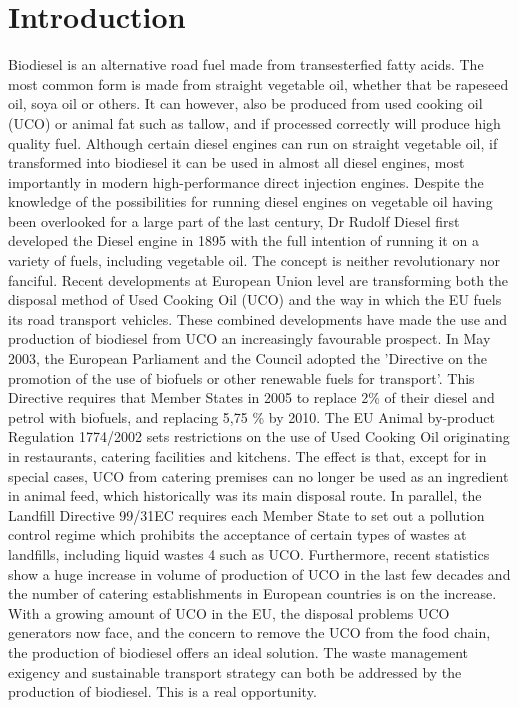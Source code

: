 \documentclass[11pt,fleqn]{book} %
\begin{document}


\chapter{Introduction}


Biodiesel is an alternative road fuel made from transesterfied fatty acids. The most common
form is made from straight vegetable oil, whether that be rapeseed oil, soya oil or others. It
can however, also be produced from used cooking oil (UCO) or animal fat such as tallow,
and if processed correctly will produce high quality fuel. Although certain diesel engines can
run on straight vegetable oil, if transformed into biodiesel it can be used in almost all diesel
engines, most importantly in modern high-performance direct injection engines.
Despite the knowledge of the possibilities for running diesel engines on vegetable oil having
been overlooked for a large part of the last century, Dr Rudolf Diesel first developed the
Diesel engine in 1895 with the full intention of running it on a variety of fuels, including
vegetable oil. The concept is neither revolutionary nor fanciful.
Recent developments at European Union level are transforming both the disposal method of
Used Cooking Oil (UCO) and the way in which the EU fuels its road transport vehicles.
These combined developments have made the use and production of biodiesel from UCO an
increasingly favourable prospect.
In May 2003, the European Parliament and the Council adopted the 'Directive on the
promotion of the use of biofuels or other renewable fuels for transport'. This Directive
requires that Member States in 2005 to replace 2\% of their diesel and petrol with biofuels,
and replacing 5,75 \% by 2010.
The EU Animal by-product Regulation 1774/2002 sets restrictions on the use of Used
Cooking Oil originating in restaurants, catering facilities and kitchens. The effect is that,
except for in special cases, UCO from catering premises can no longer be used as an
ingredient in animal feed, which historically was its main disposal route. In parallel, the
Landfill Directive 99/31EC requires each Member State to set out a pollution control regime
which prohibits the acceptance of certain types of wastes at landfills, including liquid wastes
4
such as UCO. Furthermore, recent statistics show a huge increase in volume of production of
UCO in the last few decades and the number of catering establishments in European
countries is on the increase.
With a growing amount of UCO in the EU, the disposal problems UCO generators now face,
and the concern to remove the UCO from the food chain, the production of biodiesel offers
an ideal solution. The waste management exigency and sustainable transport strategy can
both be addressed by the production of biodiesel. This is a real opportunity.
\end{document}
